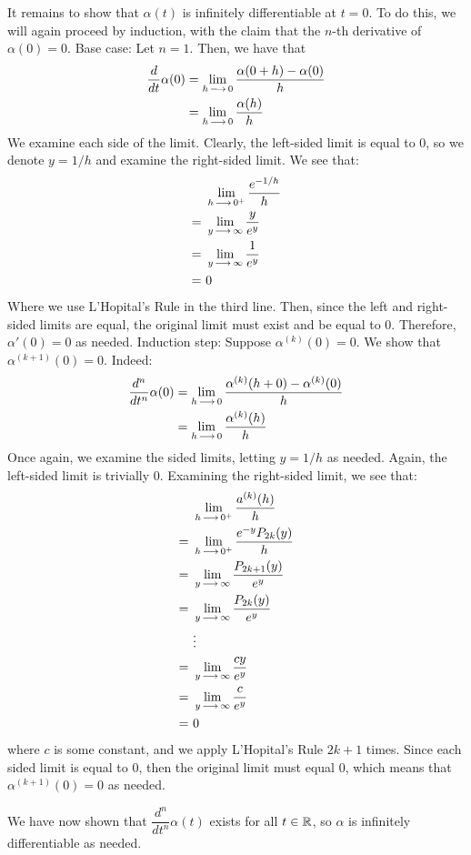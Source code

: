 \begin{soln}
    It remains to show that $ \alpha(t) $ is infinitely differentiable at
    $ t = 0 $. To do this, we will again proceed by induction, with the claim
    that the $ n $-th derivative of $ \alpha(0) = 0 $. \vsp
    Base case: Let $ n = 1 $. Then, we have that
    \begin{align*}
        \frac{d}{dt} \alpha(0) & = \lim_{h\operatorname{\longrightarrow} 0} \frac{\alpha(0 + h)
        - \alpha(0)}{h} \\
                               & = \lim_{h \operatorname{\longrightarrow} 0} \frac{\alpha(h)}{h}
    \end{align*}
    We examine each side of the limit.
    Clearly, the left-sided limit is equal to 0, so we 
    denote $ y = 1/h $ and examine the right-sided limit. We see that:
    \begin{align*}
        & \lim_{ h \operatorname{\longrightarrow} 0^{+}} \frac{e^{-1/h}}{h} \\
        = \ & \lim_{y \operatorname{\longrightarrow} \infty} \frac{y}{e^{y}} \\
        = \ & \lim_{y \operatorname{\longrightarrow} \infty} \frac{1}{e^{y}} \\
        = \ & 0
    \end{align*}
    Where we use L'Hopital's Rule in the third line.
    Then, since the left and right-sided limits are equal,
    the original limit must exist and be equal to 0.
    Therefore, $ \alpha'(0) = 0 $ as needed. \vsp
    Induction step: Suppose $ \alpha^{(k)}(0) = 0 $.
    We show that $ \alpha^{(k+1)}(0) = 0 $. Indeed:
    \begin{align*}
        \frac{d^{n}}{dt^{n}} \alpha(0) & = \lim_{h \operatorname{\longrightarrow} 0} 
        \frac{\alpha^{(k)}(h + 0) - \alpha^{(k)}(0)}{h} \\
                    & = \lim_{h \operatorname{\longrightarrow} 0} \frac{\alpha^{(k)}(h)}{h}
    \end{align*}
    Once again, we examine the sided limits, letting $ y = 1/h $ as needed.
    Again, the left-sided limit is trivially 0. Examining the right-sided limit,
    we see that:
    \begin{align*}
        & \lim_{h \operatorname{\longrightarrow} 0^{+}} \frac{a^{(k)}(h)}{h} \\
        = \ & \lim_{h \operatorname{\longrightarrow} 0^{+}} \frac{e^{-y}P_{2k}(y)}{h} \\
        = \ & \lim_{y \operatorname{\longrightarrow} \infty} \frac{P_{2k+1}(y)}{e^{y}} \\
        = \ & \lim_{y \operatorname{\longrightarrow} \infty} \frac{P_{2k}(y)}{e^{y}} \\
            & \vdots \\
        = \ & \lim_{y \operatorname{\longrightarrow} \infty} \frac{cy}{e^{y}} \\
        = \ & \lim_{y \operatorname{\longrightarrow} \infty} \frac{c}{e^{y}} \\
        = \ & 0
    \end{align*}
    where $ c $ is some constant, and we apply L'Hopital's Rule $ 2k + 1 $
    times. Since each sided limit is equal to 0, then the original limit must
    equal 0, which means that $ \alpha^{(k+1)}(0) = 0 $ as needed. \npgh

    We have now shown that $ \dfrac{d^{n}}{dt^{n}} \alpha(t) $ exists for all
    $ t \in \mathbb{R} $, so $ \alpha $ is infinitely differentiable as needed.
\end{soln}

